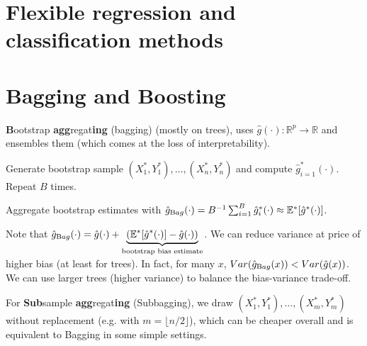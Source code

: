 \section{Flexible regression and classification methods}\label{sec:flexible_regression_and_classification_methods}

\section{Bagging and Boosting}\label{sec:bagging_and_boosting}
\begin{sectionbox}\nospacing{}
  \textbf{B}ootstrap \textbf{agg}regat\textbf{ing} (bagging) (mostly on trees), uses $\hat g(\cdot): \mathbb{R}^{p}\rightarrow \mathbb{R}$ and ensembles them (which comes at the loss of interpretability).
  \begin{enumeratenosep}[label=\roman*]
    \item Generate bootstrap sample $(X_{1}^{\ast}, Y_{1}^{\ast}), \dots, (X_{n}^{\ast}, Y_{n}^{\ast})$ and compute $\hat{g}^{\ast}_{i=1}(\cdot)$. Repeat $B$ times.
    \item Aggregate bootstrap estimates with $\hat{g}_{\textrm Bag}(\cdot) = B^{-1}\sum_{i=1}^{B} \hat{g}^{\ast}_{i}(\cdot) \approx \mathbb{E}^{\ast}[\hat{g}^{\ast}(\cdot)]$.
  \end{enumeratenosep}
  Note that $\hat{g}_{\textrm Bag}(\cdot) = \hat{g}(\cdot) + \underbrace{(\mathbb{E}^{\ast}[\hat{g}^{\ast}(\cdot)] -\hat{g}(\cdot))}_{\text{bootstrap bias estimate}}$.
  We can reduce variance at price of higher bias (at least for trees).
  In fact, for many $x$, $Var(\hat{g}_{\textrm Bag}(x)) < Var(\hat{g}(x))$. We can use larger trees (higher variance) to balance the bias-variance trade-off.

  For \textbf{Sub}sample \textbf{agg}regat\textbf{ing} (Subbagging), we draw $(X_{1}^{\ast}, Y_{1}^{\ast}), \dots, (X_{m}^{\ast}, Y_{m}^{\ast})$ without replacement (e.g. with $m = \lfloor n/2\rfloor$), which can be cheaper overall and is equivalent to Bagging in some simple settings.
\end{sectionbox}

